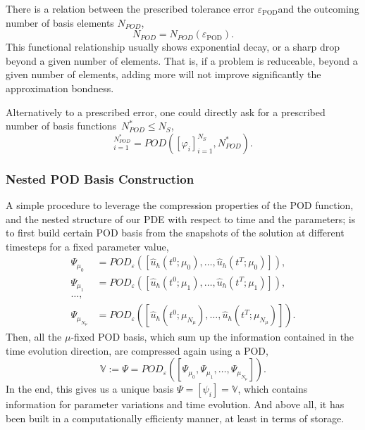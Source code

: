 \documentclass[../main.tex]{subfiles}
\newcommand{\rbV}{\ensuremath{\mathbb{V}}}
\newcommand{\epspod}{\ensuremath{\varepsilon_\text{POD}}}
\begin{document}
There is a relation between the prescribed tolerance error \epspod and the outcoming number of basis elements $N_{POD}$, 
\begin{equation}
    N_{POD} = N_{POD}(\epspod).
\end{equation}
This functional relationship usually shows exponential decay, or a sharp drop beyond a given number of elements.
That is, if a problem is reduceable, beyond a given number of elements, adding more will not improve significantly the approximation bondness. 

Alternatively to a prescribed error, one could directly ask for a prescribed number of basis functions~$N^{*}_{POD} \leq N_S$,
\begin{equation}
    [\psi_i]_{i=1}^{N^{*}_{POD}} = POD\left([\varphi_i]_{i=1}^{N_S}, N^{*}_{POD}\right).
\end{equation}

\subsubsection{Nested POD Basis Construction}
\label{sec:1d_rom_heat_equation_basis_construction_nested}
A simple procedure to leverage the compression properties of the POD function, and the nested structure of our PDE with respect to time and the parameters; is to first build certain POD basis from the snapshots of the solution at different timesteps for a fixed parameter value,
\begin{align*}
    \Psi_{\mu_0} &= POD_{\varepsilon}\left(\left[\hat{u}_h(t^0; \mu_0), \ldots, \hat{u}_h(t^T; \mu_0)\right]\right), \\
    \Psi_{\mu_1} &= POD_{\varepsilon}\left(\left[\hat{u}_h(t^0; \mu_1), \ldots, \hat{u}_h(t^T; \mu_1)\right]\right), \\  
    \ldots, \\
    \Psi_{\mu_{N_{\mu}}} &= POD_{\varepsilon}\left(\left[\hat{u}_h(t^0; \mu_{N_{\mu}}), \ldots, \hat{u}_h(t^T; \mu_{N_{\mu}})\right]\right).
\end{align*}
Then, all the $\mu$-fixed POD basis, which sum up the information contained in the time evolution direction, are compressed again using a POD,
\begin{equation*}
    \rbV := \Psi = POD_{\varepsilon} \left(\left[\Psi_{\mu_0}, \Psi_{\mu_1}, \ldots, \Psi_{\mu_{N_{\mu}}}\right]\right).
\end{equation*}
In the end, this gives us a unique basis $\Psi = [\psi_i] = \rbV$, which contains information for parameter variations and time evolution.
And above all, it has been built in a computationally efficienty manner, at least in terms of storage.
\end{document}
